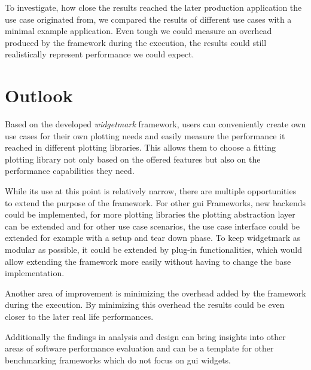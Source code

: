 To investigate, how close the results reached the later production application
the use case originated from, we compared the results of different use cases
with a minimal example application. Even tough we could measure an overhead
produced by the framework during the execution, the results could still
realistically represent performance we could expect.

\section{Outlook}
\label{sec:Conclusion:Outlook}

Based on the developed \emph{widgetmark} framework, users can conveniently
create own use cases for their own plotting needs and easily measure the
performance it reached in different plotting libraries. This allows them to
choose a fitting plotting library not only based on the offered features but
also on the performance capabilities they need.

While its use at this point is relatively narrow, there are multiple
opportunities to extend the purpose of the framework. For other \gls{gui}
Frameworks, new backends could be implemented, for more plotting libraries the
plotting abstraction layer can be extended and for other use case scenarios, the
use case interface could be extended for example with a setup and tear down
phase.  To keep widgetmark as modular as possible, it could be extended by
plug-in functionalities, which would allow extending the framework more easily
without having to change the base implementation.

Another area of improvement is minimizing the overhead added by the framework
during the execution. By minimizing this overhead the results could be even
closer to the later real life performances.

Additionally the findings in analysis and design can bring insights into other
areas of software performance evaluation and can be a template for other
benchmarking frameworks which do not focus on \gls{gui} widgets.
